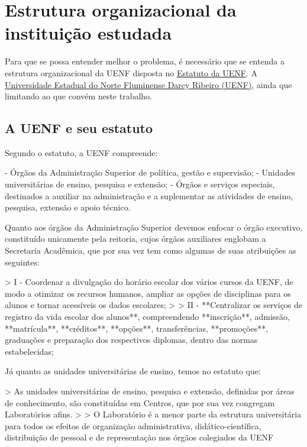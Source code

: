 \chapter{Estrutura organizacional da instituição estudada} %

Para que se possa entender melhor o problema, é necessário que se entenda a estrutura organizacional da UENF disposta no \href{https://www.uenf.br/UENF_ARQUIVOS/Downloads/REITORIA_1360_1101117875.pdf}{Estatuto da UENF}. A \href{https://uenf.br/portal/}{Universidade Estadual do Norte Fluminense Darcy Ribeiro (UENF)}, ainda que limitando ao que convém neste trabalho.

\section{A UENF e seu estatuto} %


    Segundo o estatuto, a UENF compreende:

    - Órgãos da Administração Superior de política, gestão e supervisão;
    - Unidades universitárias de ensino, pesquisa e extensão;
    - Órgãos e serviços especiais, destinados a auxiliar na administração e a suplementar as atividades de ensino, pesquisa, extensão e apoio técnico.

    Quanto aos órgãos da Administração Superior devemos enfocar o órgão executivo, constituído unicamente pela reitoria, cujos órgãos auxiliares englobam a Secretaria Acadêmica, que por sua vez tem como algumas de suas atribuições as seguintes:

    > I - Coordenar a divulgação do horário escolar dos vários cursos da UENF, de modo a otimizar os recursos humanos, ampliar as opções de disciplinas para os alunos e tornar acessíveis os dados escolares;
    >
    > II - **Centralizar os serviços de registro da vida escolar dos alunos**, compreendendo **inscrição**, admissão, **matrícula**, **créditos**, **opções**, transferências, **promoções**, graduações e preparação dos respectivos diplomas, dentro das normas estabelecidas;

    Já quanto as unidades universitárias de ensino, temos no estatuto que:

    > As unidades universitárias de ensino, pesquisa e extensão, definidas por áreas de conhecimento, são constituídas em Centros, que por sua vez congregam Laboratórios afins.
    >
    > O Laboratório é a menor parte da estrutura universitária para todos os efeitos de organização administrativa, didático-científica, distribuição de pessoal e de representação nos órgãos colegiados da UENF

